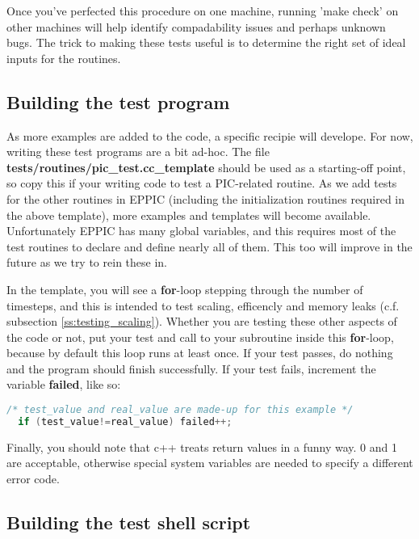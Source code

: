 Once you've perfected this procedure on one machine, running 'make
check' on other machines will help identify compadability issues and
perhaps unknown bugs. The trick to making these tests useful is to
determine the right set of ideal inputs for the routines. 

\subsection{Building the test program}

As more examples are added to the code, a specific recipie will
develope. For now, writing these test programs are a bit ad-hoc. The
file \textbf{tests/routines/pic\_test.cc\_template} should be used as a
starting-off point, so copy this if your writing code to test a
PIC-related routine. As we add tests for the other routines in EPPIC
(including the initialization routines required in the above
template), more examples and templates will become
available. Unfortunately EPPIC has many global variables, and this
requires most of the test routines to declare and define nearly all of
them. This too will improve in the future as we try to rein these
in. 

In the template, you will see a \textbf{for}-loop stepping through the
number of timesteps, and this is intended to test scaling, efficencly
and memory leaks (c.f. subsection \ref{ss:testing_scaling}). Whether
you are testing these other aspects of the code or not, put your test
and call to your subroutine inside this \textbf{for}-loop, because by
default this loop runs at least once. If your test passes, do nothing
and the program should finish successfully. If your test fails,
increment the variable \textbf{failed}, like so:
\begin{lstlisting}[language=C++]
  /* test_value and real_value are made-up for this example */
  if (test_value!=real_value) failed++;
\end{lstlisting}
Finally, you should note that c++
treats return values in a funny way. 0 and 1 are acceptable, otherwise 
special system variables are needed to specify a different error
code. 

\subsection{Building the test shell script}

